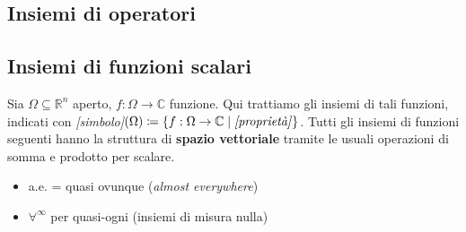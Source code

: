 \documentclass[a4paper,10pt]{article}
\theoremstyle{definition}
\newcommand{\re}{\mathbb{R}} %
\newcommand{\im}{\mathbb{C}} %
\theoremstyle{indentdefinition}
\theoremstyle{indenttheorem}
\theoremstyle{myremark}
\theoremstyle{indentgeneral}
\begin{document}
\begin{landscape}
\subsection{Insiemi di operatori}
\subsection{Insiemi di funzioni scalari}
Sia $\Omega\subseteq\re^n$ aperto, $f:\Omega\to \im$ funzione. Qui trattiamo gli insiemi di tali funzioni, indicati con \textit{[simbolo]}$(\Omega)\coloneqq\{f:\Omega\to\im\mid \text{\textit{[proprietà]}}\}$. Tutti gli insiemi di funzioni seguenti hanno la struttura di \textbf{spazio vettoriale} tramite le usuali operazioni di somma e prodotto per scalare. 
\begin{itemize}
    \item a.e. = quasi ovunque (\textit{almost everywhere})
    \item $\forall^\infty$ per quasi-ogni (insiemi di misura nulla)
\end{itemize}


\end{landscape}
\end{document}
